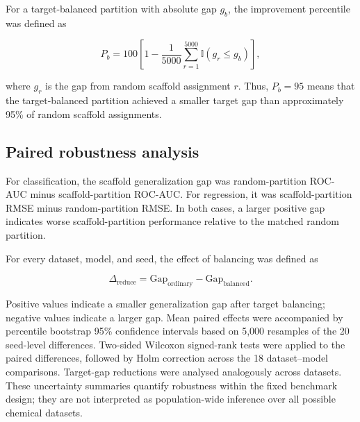 For a target-balanced partition with absolute gap $g_b$, the improvement percentile was defined as

\begin{equation}
P_b=100\left[1-\frac{1}{5000}\sum_{r=1}^{5000}\mathbb{I}(g_r\leq g_b)\right],
\label{eq:null-percentile}
\end{equation}

where $g_r$ is the gap from random scaffold assignment $r$. Thus, $P_b=95$ means that the target-balanced partition achieved a smaller target gap than approximately 95\% of random scaffold assignments.

\subsection{Paired robustness analysis}

For classification, the scaffold generalization gap was random-partition ROC-AUC minus scaffold-partition ROC-AUC. For regression, it was scaffold-partition RMSE minus random-partition RMSE. In both cases, a larger positive gap indicates worse scaffold-partition performance relative to the matched random partition.

For every dataset, model, and seed, the effect of balancing was defined as

\begin{equation}
\Delta_{\mathrm{reduce}}=\mathrm{Gap}_{\mathrm{ordinary}}-\mathrm{Gap}_{\mathrm{balanced}}.
\label{eq:gap-reduction}
\end{equation}

Positive values indicate a smaller generalization gap after target balancing; negative values indicate a larger gap. Mean paired effects were accompanied by percentile bootstrap 95\% confidence intervals based on 5,000 resamples of the 20 seed-level differences. Two-sided Wilcoxon signed-rank tests were applied to the paired differences, followed by Holm correction across the 18 dataset--model comparisons. Target-gap reductions were analysed analogously across datasets. These uncertainty summaries quantify robustness within the fixed benchmark design; they are not interpreted as population-wide inference over all possible chemical datasets.